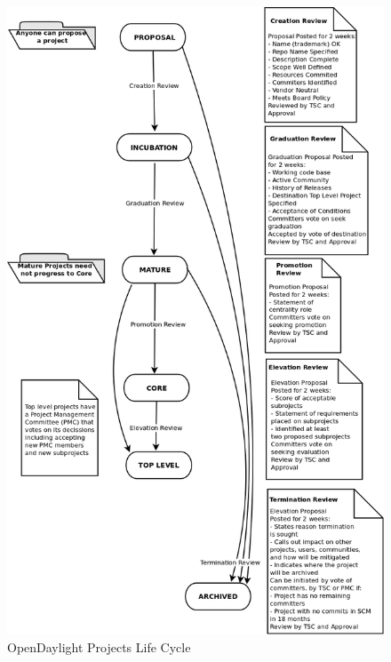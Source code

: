 \documentclass[a4paper, 12pt]{book}
\begin{document}
\begin{center}
 \begin{figure}[H]
 \begin{center}
   \includegraphics[width=14cm]{img/odl-proj-lifecycle-00.png}
   \caption{OpenDaylight Projects Life Cycle}
   \label{fig:odl_tech_proj_life_diagram}
 \end{center}
 \end{figure}
\end{center}
\end{document}
